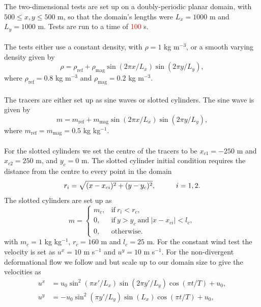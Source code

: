\documentclass{ametsocV6.1}
\newcommand{\change}[1]{\textcolor{red}{#1}}
\begin{document}
The two-dimensional tests are set up on a doubly-periodic planar domain, with $500 \leq x,y \leq 500$ m, so that the domain's lengths were $L_x=1000$ m and $L_y=1000$ m.
Tests are run to a time of \change{100} s.
\\
\\
The tests either use a constant density, with $\rho=1$ kg m$^{-3}$, or a smooth varying density given by
\begin{equation}
    \rho = \rho_{\mathrm{ref}} + \rho_{\mathrm{mag}} \sin(2 \pi x/L_x) \sin(2 \pi y/L_y),
\end{equation}
where $\rho_{\mathrm{ref}}=0.8$ kg m$^{-3}$ and $\rho_{\mathrm{mag}}=0.2$ kg m$^{-3}$. \\ 
\\
The tracers are either set up as sine waves or slotted cylinders. The sine wave is given by
\begin{equation}
    m = m_{\mathrm{ref}} + m_{\mathrm{mag}} \sin(2 \pi x/L_x) \sin(2 \pi y/L_y),
\end{equation} 
where $m_{\mathrm{ref}}=m_{\mathrm{mag}}=0.5$ kg kg$^{-1}$. \\
\\
For the slotted cylinders we set the centre of the tracers to be $x_{c1} = -250$ m and $x_{c2}=250$ m, and $y_c=0$ m.
The slotted cylinder initial condition requires the distance from the centre to every point in the domain
\begin{equation}
    r_i = \sqrt{(x-x_{ci})^2+(y-y_c)^2}, \hspace*{1cm} i=1,2.
\end{equation}
The slotted cylinders are set up as
\begin{equation}
    m = 
    \begin{cases}
        m_c, & \mathrm{if} \ r_i < r_c, \\
        0, & \mathrm{if} \ y>y_c \ \mathrm{and} \ |x-x_{ci}|<l_c, \\
        0, & \mathrm{otherwise}.
    \end{cases}
\end{equation}
with $m_c=1$ kg kg$^{-1}$, $r_c=160$ m and $l_c=25$ m.
For the constant wind test the velocity is set as $u^x=10$ m s$^{-1}$ and $u^y=10$ m s$^{-1}$. For the non-divergent deformational flow we follow \cite{skamarock2006limiters} and \citet{kent2020positive} but scale up to our domain size to give the velocities as
\begin{subequations}
\begin{align}
u^x & =  u_0 \sin^2(\pi x'/L_x)\sin(2 \pi y'/L_y)\cos(\pi t/T)+u_0,\\ 
u^y & = -u_0 \sin^2(\pi y'/L_y)\sin(L_x)\cos(\pi t/T)+u_0,
\end{align}
\end{subequations}
\end{document}
